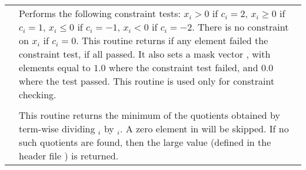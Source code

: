 \begin{supertabular}{|p{\colone}|p{\coltwo}|}
& Performs the following constraint tests:
$x_i > 0$ if $c_i=2$,
$x_i \ge 0$ if $c_i=1$,
$x_i \le 0$ if $c_i=-1$,
$x_i < 0$ if $c_i=-2$.
There is no constraint on $x_i$ if $c_i=0$.
This routine returns  if any element failed
the constraint test,  if all passed.  It also sets a
mask vector , with elements equal to $1.0$ where the constraint 
test failed, and $0.0$ where the test passed.
This routine is used only for constraint checking.
\\[2mm]
 &  \\
& This routine returns the minimum of the quotients obtained   
by term-wise dividing $_i$ by $_i$. 
A zero element in  will be skipped. 
If no such quotients are found, then the large value 
 (defined in the header file )
is returned. 
\\
\end{supertabular}
\bigskip
